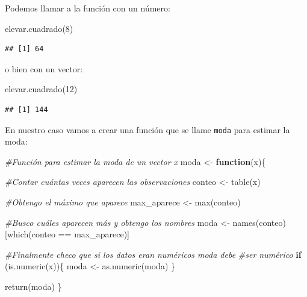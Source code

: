 \documentclass[
]{book}
\newenvironment{Shaded}{\begin{snugshade}}{\end{snugshade}}
\newcommand{\CommentTok}[1]{\textcolor[rgb]{0.56,0.35,0.01}{\textit{#1}}}
\newcommand{\ControlFlowTok}[1]{\textcolor[rgb]{0.13,0.29,0.53}{\textbf{#1}}}
\newcommand{\DecValTok}[1]{\textcolor[rgb]{0.00,0.00,0.81}{#1}}
\newcommand{\FunctionTok}[1]{\textcolor[rgb]{0.00,0.00,0.00}{#1}}
\newcommand{\NormalTok}[1]{#1}
\newcommand{\OtherTok}[1]{\textcolor[rgb]{0.56,0.35,0.01}{#1}}
\newcommand{\SpecialCharTok}[1]{\textcolor[rgb]{0.00,0.00,0.00}{#1}}
\begin{document}
Podemos llamar a la función con un número:

\begin{Shaded}
\begin{Highlighting}[]
\FunctionTok{elevar.cuadrado}\NormalTok{(}\DecValTok{8}\NormalTok{)}
\end{Highlighting}
\end{Shaded}

\begin{verbatim}
## [1] 64
\end{verbatim}

o bien con un vector:

\begin{Shaded}
\begin{Highlighting}[]
\FunctionTok{elevar.cuadrado}\NormalTok{(}\DecValTok{12}\NormalTok{)}
\end{Highlighting}
\end{Shaded}

\begin{verbatim}
## [1] 144
\end{verbatim}

En nuestro caso vamos a crear una función que se llame \texttt{moda} para estimar la moda:

\begin{Shaded}
\begin{Highlighting}[]
\CommentTok{\#Función para estimar la moda de un vector x}
\NormalTok{moda }\OtherTok{\textless{}{-}} \ControlFlowTok{function}\NormalTok{(x)\{}
  
  \CommentTok{\#Contar cuántas veces aparecen las observaciones}
\NormalTok{  conteo }\OtherTok{\textless{}{-}} \FunctionTok{table}\NormalTok{(x)}
  
  \CommentTok{\#Obtengo el máximo que aparece}
\NormalTok{  max\_aparece }\OtherTok{\textless{}{-}} \FunctionTok{max}\NormalTok{(conteo)}
  
  \CommentTok{\#Busco cuáles aparecen más y obtengo los nombres}
\NormalTok{  moda }\OtherTok{\textless{}{-}} \FunctionTok{names}\NormalTok{(conteo)[}\FunctionTok{which}\NormalTok{(conteo }\SpecialCharTok{==}\NormalTok{ max\_aparece)]}
  
  \CommentTok{\#Finalmente checo que si los datos eran numéricos moda debe}
  \CommentTok{\#ser numérico}
  \ControlFlowTok{if}\NormalTok{ (}\FunctionTok{is.numeric}\NormalTok{(x))\{}
\NormalTok{    moda }\OtherTok{\textless{}{-}} \FunctionTok{as.numeric}\NormalTok{(moda)}
\NormalTok{  \}}
  
  \FunctionTok{return}\NormalTok{(moda)}
\NormalTok{\}}
\end{Highlighting}
\end{Shaded}
\end{document}

